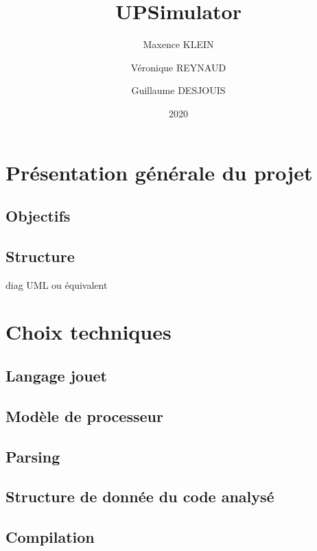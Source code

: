 \documentclass[10pt]{scrreprt} %
\title{UPSimulator}
\author{Maxence KLEIN\\ \and Véronique REYNAUD\\ \and Guillaume DESJOUIS }
\date{2020}
\begin{document}
\maketitle
\tableofcontents
\clearpage

\section{Présentation générale du projet}
\subsection{Objectifs}

\subsection{Structure}
diag UML ou équivalent

\clearpage
\section{Choix techniques}
\subsection{Langage jouet}



\clearpage

\subsection{Modèle de processeur}


\subsection{Parsing}




\subsection{Structure de donnée du code analysé}


\subsection{Compilation}

\end{document}
